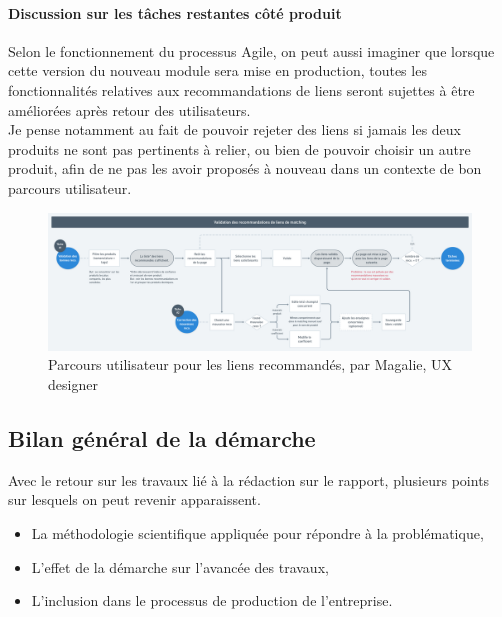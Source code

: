 \documentclass{rapportCS}
\begin{document}
\paragraph{Discussion sur les tâches restantes côté produit}
Selon le fonctionnement du processus Agile, on peut aussi imaginer que lorsque cette version
du nouveau module sera mise en production, toutes les fonctionnalités relatives aux recommandations
de liens seront sujettes à être améliorées après retour des utilisateurs. \\
Je pense notamment au fait de pouvoir rejeter des liens si jamais les deux produits ne sont pas
pertinents à relier, ou bien de pouvoir choisir un autre produit,
afin de ne pas les avoir proposés à nouveau dans un contexte de bon parcours utilisateur.

\begin{figure}[h!]
  \centerline{\includegraphics[width=20cm]{images/parcours_ux.png}}
  \caption{\label{Parcours UX} Parcours utilisateur pour les liens recommandés, par Magalie, UX designer}
  \end{figure}

\subsection{Bilan général de la démarche}

Avec le retour sur les travaux lié à la rédaction sur le rapport,
plusieurs points sur lesquels on peut revenir apparaissent.\\
\begin{itemize}
  \item La méthodologie scientifique appliquée pour répondre à la problématique,
  \item L'effet de la démarche sur l'avancée des travaux,
  \item L'inclusion dans le processus de production de l'entreprise.
\end{itemize}
\end{document}
